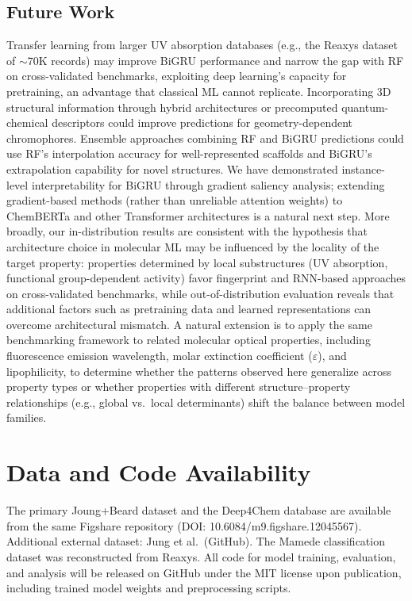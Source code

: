 \subsection*{Future Work}
Transfer learning from larger UV absorption databases (e.g., the Reaxys dataset of $\sim$70K records) may improve BiGRU performance and narrow the gap with RF on cross-validated benchmarks, exploiting deep learning's capacity for pretraining\cite{vermeire2021transfer}, an advantage that classical ML cannot replicate.
Incorporating 3D structural information through hybrid architectures\cite{gilmer2017neural} or precomputed quantum-chemical descriptors\cite{lupopasini2023excited} could improve predictions for geometry-dependent chromophores.
Ensemble approaches combining RF and BiGRU predictions could use RF's interpolation accuracy for well-represented scaffolds and BiGRU's extrapolation capability for novel structures.
We have demonstrated instance-level interpretability for BiGRU through gradient saliency analysis; extending gradient-based methods (rather than unreliable attention weights\cite{jain2019attention}) to ChemBERTa and other Transformer architectures is a natural next step.
More broadly, our in-distribution results are consistent with the hypothesis that architecture choice in molecular ML may be influenced by the locality of the target property\cite{chenMolecularLanguage2023, jiang2023trangru}: properties determined by local substructures (UV absorption, functional group-dependent activity) favor fingerprint and RNN-based approaches on cross-validated benchmarks, while out-of-distribution evaluation reveals that additional factors such as pretraining data and learned representations can overcome architectural mismatch.
A natural extension is to apply the same benchmarking framework to related molecular optical properties, including fluorescence emission wavelength, molar extinction coefficient ($\varepsilon$), and lipophilicity, to determine whether the patterns observed here generalize across property types or whether properties with different structure--property relationships (e.g., global vs.\ local determinants) shift the balance between model families.


\section*{Data and Code Availability}
The primary Joung+Beard dataset and the Deep4Chem database are available from the same Figshare repository\cite{joung2020experimental, beard2019comparative} (DOI: 10.6084/m9.figshare.12045567).
Additional external dataset: Jung et al.\ (GitHub)\cite{jung2024machine}.
The Mamede classification dataset was reconstructed from Reaxys\cite{mamede2021machine}.
All code for model training, evaluation, and analysis will be released on GitHub under the MIT license upon publication, including trained model weights and preprocessing scripts.


